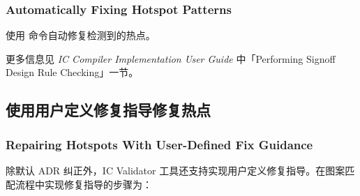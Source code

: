 \subsubsection*{Automatically Fixing Hotspot Patterns}

使用  命令自动修复检测到的热点。

\begin{seeAlsoBox}
更多信息见 \textit{IC Compiler Implementation User Guide} 中「Performing Signoff Design Rule Checking」一节。
\end{seeAlsoBox}

\subsection{使用用户定义修复指导修复热点}
\subsubsection*{Repairing Hotspots With User-Defined Fix Guidance}

除默认 ADR 纠正外，IC Validator 工具还支持实现用户定义修复指导。在图案匹配流程中实现修复指导的步骤为：

